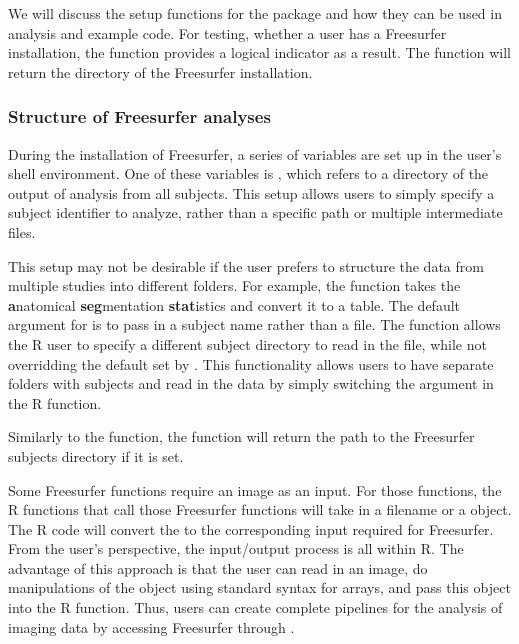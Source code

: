 We will discuss the setup functions for the  package and
how they can be used in analysis and example code. For testing, whether
a user has a Freesurfer installation, the  function
provides a logical indicator as a result. The  function
will return the directory of the Freesurfer installation.

\subsubsection{Structure of Freesurfer
analyses}\label{structure-of-freesurfer-analyses}

During the installation of Freesurfer, a series of variables are set up
in the user's shell environment. One of these variables is
, which refers to a directory of the output of
analysis from all subjects. This setup allows users to simply specify a
subject identifier to analyze, rather than a specific path or multiple
intermediate files.

This setup may not be desirable if the user prefers to structure the
data from multiple studies into different folders. For example, the
 function takes the \textbf{a}natomical
\textbf{seg}mentation \textbf{stat}istics and convert it to a table. The
default argument for  is to pass in a subject name
rather than a file. The   function
allows the R user to specify a different subject directory to read in
the file, while not overridding the default set by .
This functionality allows users to have separate folders with subjects
and read in the data by simply switching the  argument
in the R function.

Similarly to the  function, the 
function will return the path to the Freesurfer subjects directory if it
is set.

Some Freesurfer functions require an image as an input. For those
functions, the R  functions that call those Freesurfer
functions will take in a filename or a  object. The R code
will convert the  to the corresponding input required for
Freesurfer. From the user's perspective, the input/output process is all
within R. The advantage of this approach is that the user can read in an
image, do manipulations of the  object using standard syntax
for arrays, and pass this object into the  R function.
Thus, users can create complete pipelines for the analysis of imaging
data by accessing Freesurfer through .

